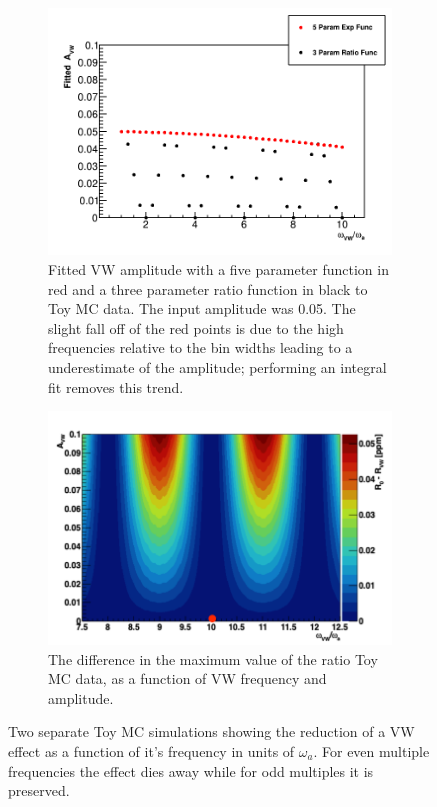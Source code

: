 \documentclass[12pt,letterpaper]{article}
\def\wa{$\omega_{a}$\xspace}
\begin{document}
\begin{figure}[]
\centering
    \begin{subfigure}[t]{0.7\textwidth}
        \centering
        \hspace*{-1cm}  
        \includegraphics[width=\textwidth]{Fitted_Avw_Vs_Wvw_1x-10x} %
        \caption{Fitted VW amplitude with a five parameter function in red and a three parameter ratio function in black to Toy MC data. The input amplitude was 0.05. The slight fall off of the red points is due to the high frequencies relative to the bin widths leading to a underestimate of the amplitude; performing an integral fit removes this trend.}
    \end{subfigure}%

    \begin{subfigure}[t]{0.7\textwidth}
        \centering
        \includegraphics[width=\textwidth]{VWRatioDiff}
        \caption{The difference in the maximum value of the ratio Toy MC data, as a function of VW frequency and amplitude.}
    \end{subfigure}
\caption[]{Two separate Toy MC simulations showing the reduction of a VW effect as a function of it's frequency in units of \wa. For even multiple frequencies the effect dies away while for odd multiples it is preserved.}
\label{fig:ToyMCVW}
\end{figure}
\end{document}
